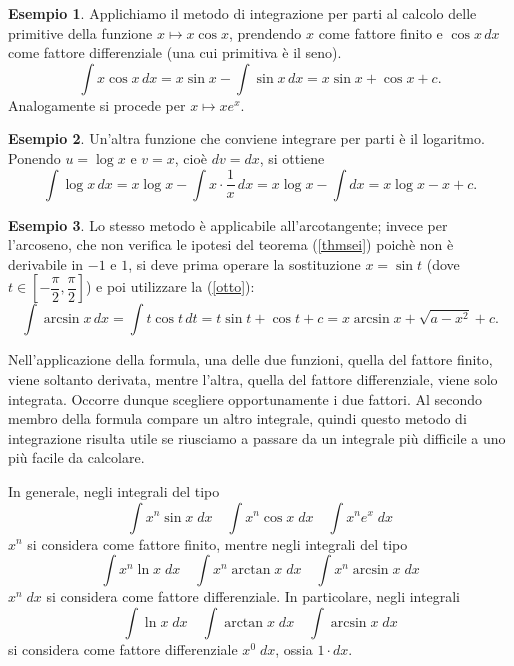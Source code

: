 \documentclass{article}
\theoremstyle{plain}
\theoremstyle{definition}
\newtheorem{exmp}{Esempio}[section]
\theoremstyle{remark}
\begin{document}
\begin{exmp}
    Applichiamo il metodo di integrazione per parti al calcolo delle primitive della funzione $x\mapsto x\cos x$, prendendo $x$ come fattore finito e $\cos x\,dx$ come fattore differenziale (una cui primitiva è il seno).
    \begin{equation}
        \int x\cos x\,dx=x\sin x-\int \sin x\,dx=x\sin x+\cos x+c.\label{otto}
    \end{equation}
    Analogamente si procede per $x\mapsto xe^x$.
\end{exmp}

\vspace{10pt}

\begin{exmp}
    Un'altra funzione che conviene integrare per parti è il logaritmo. 
    Ponendo $u=\log x$ e $v=x$, cioè $dv=dx$, si ottiene
    \[\int\log x\,dx=x\log x-\int x\cdot\dfrac{1}{x}\,dx=x\log x-\int dx=x\log x-x+c.\]
\end{exmp}

\vspace{10pt}

\begin{exmp}
    Lo stesso metodo  è applicabile all'arcotangente; invece per l'arcoseno, che non verifica le ipotesi del teorema (\ref{thmsei}) poichè non è derivabile in $-1$ e $1$, si deve prima operare la sostituzione $x=\sin t$ (dove $t\in\left[-\dfrac{\pi}{2},\dfrac{\pi}{2}\right]$) e poi utilizzare la (\ref{otto}):
    \[\int\arcsin x\,dx=\int t\cos t\,dt=t\sin t+\cos t+c=x\arcsin x+\sqrt{a-x^2}+c.\]
\end{exmp}

\vspace{10pt}

Nell'applicazione della formula, una delle due funzioni, quella del fattore finito, viene soltanto derivata, mentre l'altra, quella del fattore differenziale, viene solo integrata. Occorre dunque scegliere opportunamente i due fattori. Al secondo membro della formula compare un altro integrale, quindi questo metodo di integrazione risulta utile se riusciamo a passare da un integrale più difficile a uno più facile da calcolare.

\vspace{10pt}

In generale, negli integrali del tipo
\[\int x^n\sin x \;dx \quad \int x^n\cos x \;dx \quad \int x^ne^x \;dx\]
$x^n$ si considera come fattore finito, mentre negli integrali del tipo
\[\int x^n\ln x \;dx \quad \int x^n\arctan x \;dx \quad \int x^n\arcsin x \;dx\]
$x^n\;dx$ si considera come fattore differenziale.
In particolare, negli integrali 
\[\int \ln x \;dx \quad \int \arctan x \;dx \quad \int \arcsin x \;dx\]
si considera come fattore differenziale $x^0\;dx$, ossia $1\cdot dx$.
\end{document}
